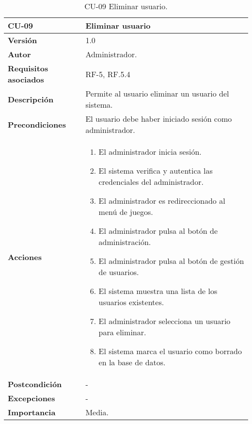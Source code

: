 \begin{table}[h!]
	\centering
	\begin{tabularx}{\linewidth}{ p{} p{} }
		\toprule
		\textbf{CU-09}    & \textbf{Eliminar usuario}\\
		\toprule
		\textbf{Versión}              & 1.0    \\
		\textbf{Autor}                & Administrador. \\
		\textbf{Requisitos asociados} & RF-5, RF.5.4 \\
		\textbf{Descripción}          & Permite al usuario eliminar un usuario del sistema.\\
		\textbf{Precondiciones}         & El usuario debe haber iniciado sesión como administrador. \\
		\textbf{Acciones}             &
		\begin{enumerate}
			\def\labelenumi{\arabic{enumi}.}
			\tightlist
			\item El administrador inicia sesión.
            \item El sistema verifica y autentica las credenciales del administrador.
            \item El administrador es redireccionado al menú de juegos.
            \item El administrador pulsa al botón de administración.
            \item El administrador pulsa al botón de gestión de usuarios.
            \item El sistema muestra una lista de los usuarios existentes.
    	\item El administrador selecciona un usuario para eliminar.
    	\item El sistema marca el usuario como borrado en la base de datos.
		\end{enumerate}\\
         \textbf{Postcondición}             & - \\
		\textbf{Excepciones}             & - \\
		\textbf{Importancia}          & Media. \\
		\bottomrule
	\end{tabularx}
	\caption{CU-09 Eliminar usuario.}
\end{table}

